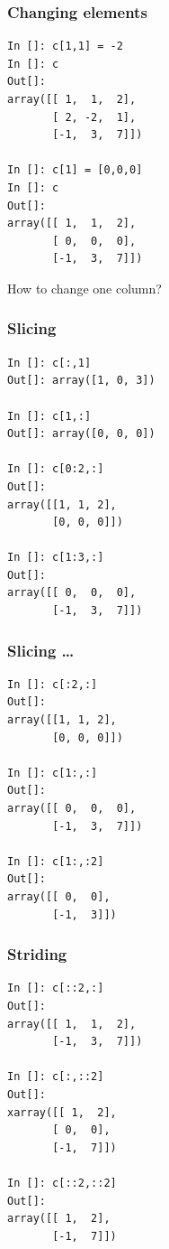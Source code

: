 \documentclass[14pt,compress]{beamer}
\begin{document}
\begin{frame}[fragile]
  \frametitle{Changing elements}
  \begin{small}
  \begin{lstlisting}
In []: c[1,1] = -2
In []: c
Out[]: 
array([[ 1,  1,  2],
       [ 2, -2,  1],
       [-1,  3,  7]])

In []: c[1] = [0,0,0]
In []: c
Out[]: 
array([[ 1,  1,  2],
       [ 0,  0,  0],
       [-1,  3,  7]])
  \end{lstlisting}
  \end{small}
How to change one \alert{column}?
\end{frame}

\begin{frame}[fragile]
  \frametitle{Slicing}
\begin{small}
  \begin{lstlisting}
In []: c[:,1]
Out[]: array([1, 0, 3])

In []: c[1,:]
Out[]: array([0, 0, 0])

In []: c[0:2,:]
Out[]: 
array([[1, 1, 2],
       [0, 0, 0]])

In []: c[1:3,:]
Out[]: 
array([[ 0,  0,  0],
       [-1,  3,  7]])
  \end{lstlisting}
\end{small}
\end{frame}

\begin{frame}[fragile]
  \frametitle{Slicing \ldots}
\begin{small}
  \begin{lstlisting}
In []: c[:2,:]
Out[]: 
array([[1, 1, 2],
       [0, 0, 0]])

In []: c[1:,:]
Out[]: 
array([[ 0,  0,  0],
       [-1,  3,  7]])

In []: c[1:,:2]
Out[]: 
array([[ 0,  0],
       [-1,  3]])
  \end{lstlisting}

\end{small}
\end{frame}

\begin{frame}[fragile]
  \frametitle{Striding}
  \begin{small}
  \begin{lstlisting}
In []: c[::2,:]
Out[]: 
array([[ 1,  1,  2],
       [-1,  3,  7]])

In []: c[:,::2]
Out[]: 
xarray([[ 1,  2],
       [ 0,  0],
       [-1,  7]])

In []: c[::2,::2]
Out[]: 
array([[ 1,  2],
       [-1,  7]])
  \end{lstlisting}
  \end{small}
\end{frame}
\end{document}
